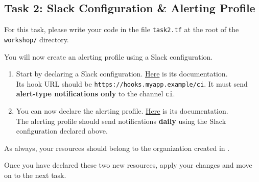 \subsection{Task 2: Slack Configuration \& Alerting Profile}\label{sec:task2}

\begin{note}
For this task, please write your code in the file \texttt{task2.tf}
at the root of the \texttt{workshop/} directory.
\end{note}

You will now create an alerting profile using a Slack configuration.

\begin{enumerate}
  \item Start by declaring a Slack configuration.
  \href{https://registry.terraform.io/providers/itera-io/taikun/latest/docs/resources/slack_configuration}{Here} is its documentation.\\

Its hook URL should be \texttt{https://hooks.myapp.example/ci}.
It must send \textbf{alert-type notifications only} to the channel \texttt{ci}.
  \item You can now declare the alerting profile.
    \href{https://registry.terraform.io/providers/itera-io/taikun/latest/docs/resources/alerting_profile}{Here} is its documentation.\\
    The alerting profile should send notifications \textbf{daily} using the Slack configuration declared above.
\end{enumerate}

\begin{warn}
As always, your resources should belong to the organization created in
.
\end{warn}

Once you have declared these two new resources, apply your changes and move on to the next task.
